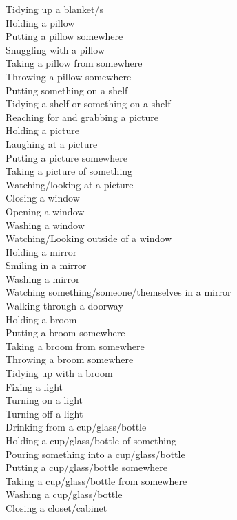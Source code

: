 \begin{multicols}{2}
Tidying up a blanket/s \\
Holding a pillow \\
Putting a pillow somewhere \\
Snuggling with a pillow \\
Taking a pillow from somewhere \\
Throwing a pillow somewhere \\
Putting something on a shelf \\
Tidying a shelf or something on a shelf \\
Reaching for and grabbing a picture \\
Holding a picture \\
Laughing at a picture \\
Putting a picture somewhere \\
Taking a picture of something \\
Watching/looking at a picture \\
Closing a window \\
Opening a window \\
Washing a window \\
Watching/Looking outside of a window \\
Holding a mirror \\
Smiling in a mirror \\
Washing a mirror \\
Watching something/someone/themselves in a mirror \\
Walking through a doorway \\
Holding a broom \\
Putting a broom somewhere \\
Taking a broom from somewhere \\
Throwing a broom somewhere \\
Tidying up with a broom \\
Fixing a light \\
Turning on a light \\
Turning off a light \\
Drinking from a cup/glass/bottle \\
Holding a cup/glass/bottle of something \\
Pouring something into a cup/glass/bottle \\
Putting a cup/glass/bottle somewhere \\
Taking a cup/glass/bottle from somewhere \\
Washing a cup/glass/bottle \\
Closing a closet/cabinet \\

\end{multicols}
